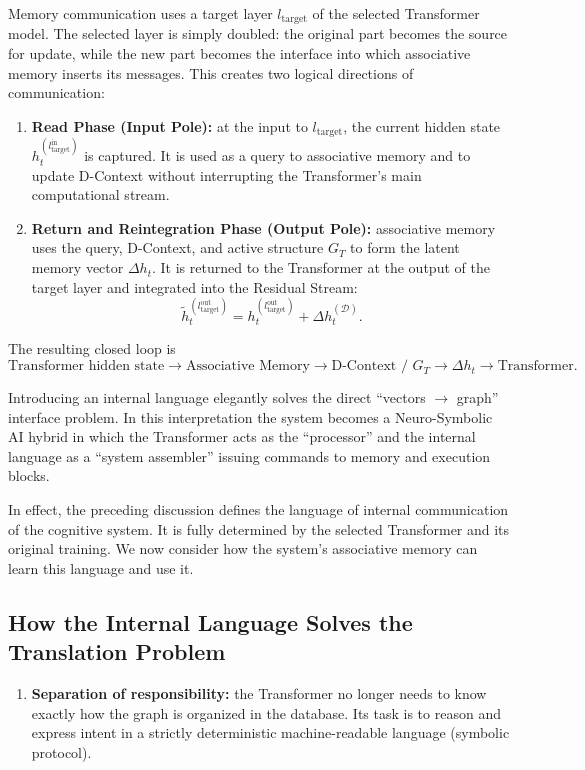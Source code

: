 \documentclass[11pt,a4paper]{article}
\begin{document}
Memory communication uses a target layer $l_{\text{target}}$ of the selected Transformer model. The selected layer is simply doubled: the original part becomes the source for update, while the new part becomes the interface into which associative memory inserts its messages. This creates two logical directions of communication:
\begin{enumerate}
\item \textbf{Read Phase (Input Pole):} at the input to $l_{\text{target}}$, the current hidden state $h_t^{(l_{\text{target}}^{\text{in}})}$ is captured. It is used as a query to associative memory and to update D-Context without interrupting the Transformer's main computational stream.
\item \textbf{Return and Reintegration Phase (Output Pole):} associative memory uses the query, D-Context, and active structure $G_T$ to form the latent memory vector $\Delta h_t$. It is returned to the Transformer at the output of the target layer and integrated into the Residual Stream:
\begin{equation}
\tilde h_t^{(l_{\text{target}}^{\text{out}})}=h_t^{(l_{\text{target}}^{\text{out}})}+\Delta h_t^{(\mathcal D)}.
\end{equation}
\end{enumerate}

The resulting closed loop is
\[
\text{Transformer hidden state}\rightarrow\text{Associative Memory}\rightarrow
\text{D-Context / }G_T\rightarrow\Delta h_t\rightarrow\text{Transformer}.
\]

Introducing an internal language elegantly solves the direct ``vectors $\rightarrow$ graph'' interface problem. In this interpretation the system becomes a Neuro-Symbolic AI hybrid in which the Transformer acts as the ``processor'' and the internal language as a ``system assembler'' issuing commands to memory and execution blocks.

In effect, the preceding discussion defines the language of internal communication of the cognitive system. It is fully determined by the selected Transformer and its original training. We now consider how the system's associative memory can learn this language and use it.

\subsection*{How the Internal Language Solves the Translation Problem}
\begin{enumerate}
\item \textbf{Separation of responsibility:} the Transformer no longer needs to know exactly how the graph is organized in the database. Its task is to reason and express intent in a strictly deterministic machine-readable language (symbolic protocol).
\end{enumerate}
\end{document}
